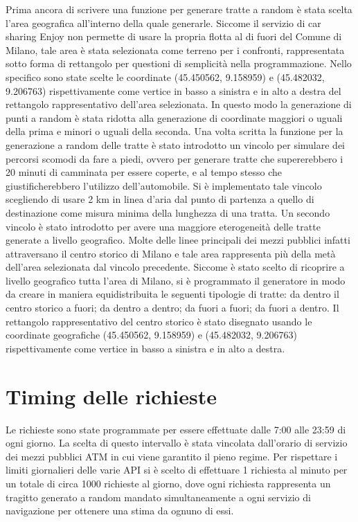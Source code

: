 Prima ancora di scrivere una funzione per generare tratte a random è stata scelta l'area geografica all'interno della quale generarle. Siccome il servizio di car sharing Enjoy non permette di usare la propria flotta al di fuori del Comune di Milano, tale area è stata selezionata come terreno per i confronti, rappresentata sotto forma di rettangolo per questioni di semplicità nella programmazione. Nello specifico sono state scelte le coordinate (45.450562\textdegree, 9.158959\textdegree) e (45.482032\textdegree, 9.206763\textdegree) rispettivamente come vertice in basso a sinistra e in alto a destra del rettangolo rappresentativo dell'area selezionata. In questo modo la generazione di punti a random è stata ridotta alla generazione di coordinate maggiori o uguali della prima e minori o uguali della seconda. Una volta scritta la funzione per la generazione a random delle tratte è stato introdotto un vincolo per simulare dei percorsi scomodi da fare a piedi, ovvero per generare tratte che supererebbero i 20 minuti di camminata per essere coperte, e al tempo stesso che giustificherebbero l'utilizzo dell'automobile. Si è implementato tale vincolo scegliendo di usare 2 km in linea d'aria dal punto di partenza a quello di destinazione come misura minima della lunghezza di una tratta. Un secondo vincolo è stato introdotto per avere una maggiore eterogeneità delle tratte generate a livello geografico. Molte delle linee principali dei mezzi pubblici infatti attraversano il centro storico di Milano e tale area rappresenta più della metà dell'area selezionata dal vincolo precedente. Siccome è stato scelto di ricoprire a livello geografico tutta l'area di Milano, si è programmato il generatore in modo da creare in maniera equidistribuita le seguenti tipologie di tratte: da dentro il centro storico a fuori; da dentro a dentro; da fuori a fuori; da fuori a dentro. Il rettangolo rappresentativo del centro storico è stato disegnato usando le coordinate geografiche (45.450562\textdegree, 9.158959\textdegree) e (45.482032\textdegree, 9.206763\textdegree) rispettivamente come vertice in basso a sinistra e in alto a destra.

\section{Timing delle richieste}

Le richieste sono state programmate per essere effettuate dalle 7:00 alle 23:59 di ogni giorno. La scelta di questo intervallo è stata vincolata dall'orario di servizio dei mezzi pubblici ATM in cui viene garantito il pieno regime. Per rispettare i limiti giornalieri delle varie API si è scelto di effettuare 1 richiesta al minuto per un totale di circa 1000 richieste al giorno, dove ogni richiesta rappresenta un tragitto generato a random mandato simultaneamente a ogni servizio di navigazione per ottenere una stima da ognuno di essi.

